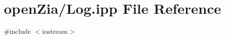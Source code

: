 \hypertarget{_log_8ipp}{}\section{open\+Zia/\+Log.ipp File Reference}
\label{_log_8ipp}
{\ttfamily \#include $<$iostream$>$}\newline
